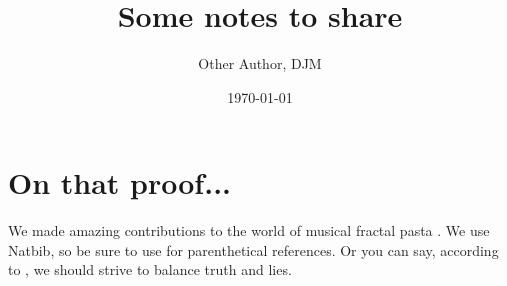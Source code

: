 \documentclass[12pt]{article}
\title{Some notes to share}
\author{Other Author, DJM}
\date{\today}
\begin{document}
\maketitle


\section{On that proof...}\label{sec:proof}


We made amazing contributions to the world of musical fractal pasta 
\citep{McDonald2017,Tibshirani2013}. We use Natbib, so be sure to use
\citep{Stein1981} for parenthetical references. Or you can say, according to
\citet{HastieTibshirani2009}, we should strive to balance truth and lies.


      
\end{document}
